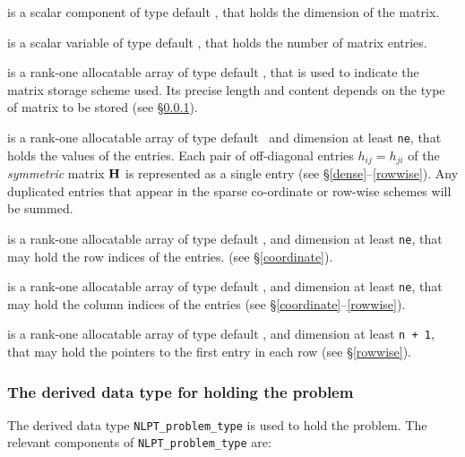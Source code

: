 \documentclass{galahad}
\begin{document}
\begin{description}

 is a scalar component of type default \integer,
that holds the dimension of the matrix.

 is a scalar variable of type default \integer, that
holds the number of matrix entries.

 is a rank-one allocatable array of type default \character, that
is used to indicate the matrix storage scheme used. Its precise length and
content depends on the type of matrix to be stored (see \S\ref{typeprob}).

 is a rank-one allocatable array of type default \realdp\,
and dimension at least {\tt ne}, that holds the values of the entries.
Each pair of off-diagonal entries $h_{ij} = h_{ji}$ of the {\em symmetric}
matrix ${\mathbf{H}}$ is represented as a single entry
(see \S\ref{dense}--\ref{rowwise}).
Any duplicated entries that appear in the sparse
co-ordinate or row-wise schemes will be summed.

 is a rank-one allocatable array of type default \integer,
and dimension at least {\tt ne}, that may hold the row indices of the entries.
(see \S\ref{coordinate}).

 is a rank-one allocatable array of type default \integer,
and dimension at least {\tt ne}, that may hold the column indices of the entries
(see \S\ref{coordinate}--\ref{rowwise}).

 is a rank-one allocatable array of type default \integer,
and dimension at least {\tt n + 1}, that may hold the pointers to
the first entry in each row (see \S\ref{rowwise}).

\end{description}


\subsubsection{The derived data type for holding the problem}\label{typeprob}
The derived data type {\tt NLPT\_problem\_type} is used to hold
the problem. The relevant components of
{\tt NLPT\_problem\_type}
are:
\end{document}
